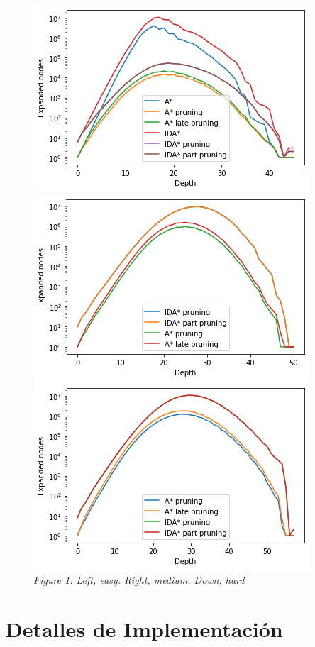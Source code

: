 \documentclass[a4paper,10pt]{article}
\begin{document}
    \begin{figure}[h!]
      \centering
      \includegraphics[scale=0.6]{15puzzle_easy.png}
      \includegraphics[scale=0.6]{15puzzle_medium.png}
      \includegraphics[scale=0.6]{15puzzle_hard.png}
      \\
      \small{\textit{Figure 1: Left, easy. Right, medium. Down, hard}}
    \end{figure}  

\section{Detalles de Implementaci\'on}
\end{document}
